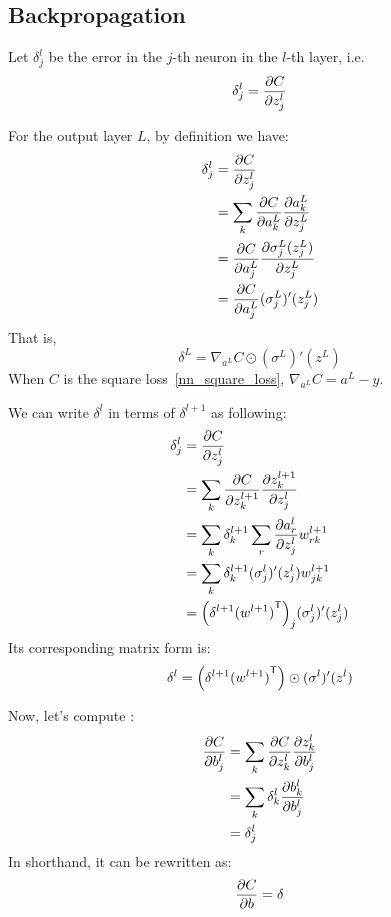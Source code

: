 \subsection{Backpropagation}
Let $\delta^l_j$ be the error in the $j$-th neuron in the $l$-th layer, i.e.
\begin{equation}
    \delta^l_j = \frac{\partial {C}}{\partial {z^l_j}}
\end{equation}

For the output layer $L$, by definition we have:
\begin{align*}
    \delta^l_j &= \frac{\partial {C}}{\partial {z^l_j}}\\
               &= \sum_k \frac{\partial {C}}{\partial {a^L_k}} \frac{\partial {a^L_k}}{\partial {z^L_j}}\\
               &= \frac{\partial {C}}{\partial {a^L_j}} \frac{\partial {\sigma^L_j(z^L_j)}}{\partial {z^L_j}}\\
               &= \frac{\partial {C}}{\partial {a^L_j}} (\sigma^L_j)'(z^L_j)
\end{align*}
That is,
\begin{equation}
    \delta^L = \nabla_{a^L}C \odot (\sigma^L)'(z^L)
\end{equation}
When $C$ is the square loss~\eqref{nn_square_loss}, $\nabla_{a^L}C = a^L - y$.
\par
We can write $\delta^l$ in terms of $\delta^{l+1}$ as following:
\begin{align*}
    \delta^l_j &= \frac{\partial {C}}{\partial {z^l_j}}\\
               &= \sum_k \frac{\partial {C}}{\partial {z^{l+1}_k}} \frac{\partial {z^{l+1}_k}}{\partial {z^l_j}}\\
               &= \sum_k \delta^{l+1}_k \sum_r \frac{\partial {a^l_r}}{\partial {z^l_j}} w^{l+1}_{rk}\\
               &= \sum_k \delta^{l+1}_k (\sigma^l_j)'(z^l_j) w^{l+1}_{jk}\\
               &= {\left(\delta^{l+1} {(w^{l+1})}^\mathsf{T}\right)}_{j} (\sigma^l_j)'(z^l_j)
\end{align*}
Its corresponding matrix form is:
\begin{equation}
    \delta^l = \left(\delta^{l+1} {(w^{l+1})}^\mathsf{T}\right) \odot (\sigma^l)'(z^l)
\end{equation}

Now, let's compute :
\begin{align*}
    \frac{\partial {C}}{\partial {b^l_j}} &= \sum_k \frac{\partial {C}}{\partial {z^l_k}} \frac{\partial {z^l_k}}{\partial {b^l_j}}\\
                     &= \sum_k \delta^l_k \frac{\partial {b^l_k}}{\partial {b^l_j}}\\
                     &= \delta^l_j
\end{align*}
In shorthand, it can be rewritten as:
\begin{equation}
    \frac{\partial {C}}{\partial {b}} = \delta
\end{equation}

